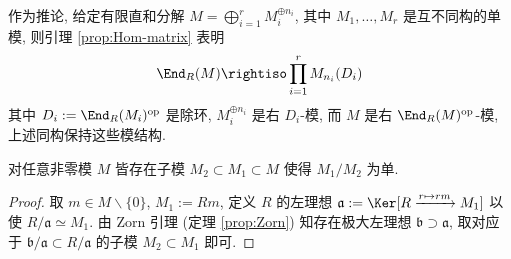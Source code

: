 作为推论, 给定有限直和分解 $M = \bigoplus_{i=1}^r M_i^{\oplus n_i}$, 其中 $M_1, \ldots, M_r$ 是互不同构的单模, 则引理 \ref{prop:Hom-matrix} 表明
\[ \End_R(M) \rightiso \prod_{i=1}^r M_{n_i}(D_i) \]
其中 $D_i := \End_R(M_i)^\text{op}$ 是除环, $M_i^{\oplus n_i}$ 是右 $D_i$-模, 而 $M$ 是右 $\End_R(M)^\text{op}$-模, 上述同构保持这些模结构.

\begin{lemma}\label{prop:existence-simple-subquotient}
	对任意非零模 $M$ 皆存在子模 $M_2 \subset M_1 \subset M$ 使得 $M_1/M_2$ 为单.
\end{lemma}
\begin{proof}
	取 $m \in M \smallsetminus \{0\}$, $M_1 := Rm$, 定义 $R$ 的左理想 $\mathfrak{a} := \Ker[R \xrightarrow{r \mapsto rm} M_1]$ 以使 $R/\mathfrak{a} \simeq M_1$. 由 Zorn 引理 (定理 \ref{prop:Zorn}) 知存在极大左理想 $\mathfrak{b} \supset \mathfrak{a}$, 取对应于 $\mathfrak{b}/\mathfrak{a} \subset R/\mathfrak{a}$ 的子模 $M_2 \subset M_1$ 即可.
\end{proof}

